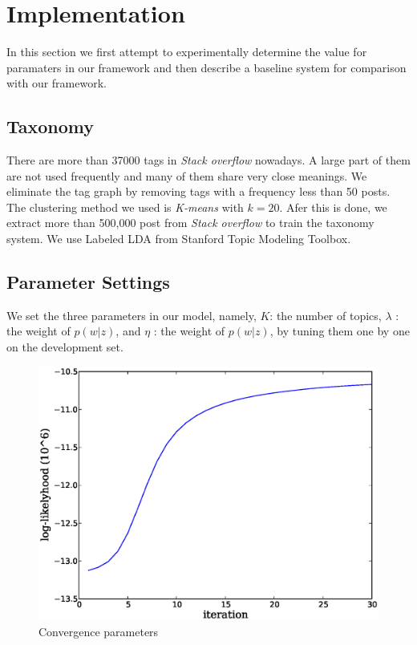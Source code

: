 \vfill\eject
\section{Implementation}
\label{sec:implement}
In this section we first attempt to experimentally determine the value for
paramaters in our framework and then describe a baseline system for comparison
with our framework.
\subsection{Taxonomy}
There are more than 37000 tags in {\it Stack overflow} nowadays. A large part
of them are not used frequently and many of them share very close meanings.
We eliminate the tag graph by removing tags with a frequency less than 50 posts.
The clustering method we used is {\it K-means} with $k=20$. Afer this is done,
we extract more than 500,000 post from {\it Stack overflow} to train the taxonomy
system. We use Labeled LDA from Stanford Topic Modeling Toolbox.


\subsection{Parameter Settings}
\label{sec:config}
We set the three parameters in our model, namely, $K$: the number
of topics, $\lambda$ : the weight of $p(w|z)$, and $\eta$ : the weight of $p(w|z)$, by
tuning them one by one on the development set.

\begin{figure}[h]
\begin{center}
\includegraphics[width=0.7\columnwidth]{figure/likelyhood.eps}
\caption{Convergence parameters}
\label{fig:conv}
\end{center}
\end{figure}
